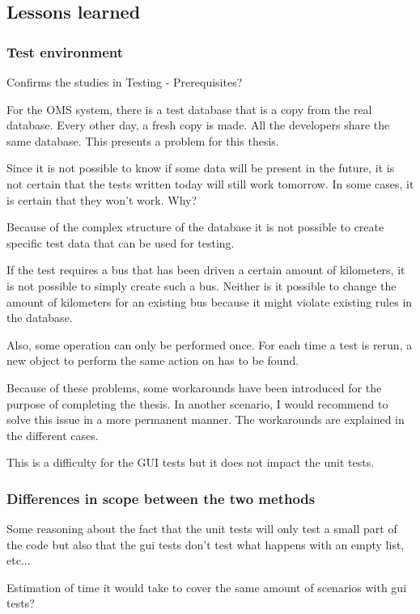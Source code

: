 \documentclass{article}
\begin{document}
		\subsection{Lessons learned}
			\subsubsection{Test environment}

			Confirms the studies in Testing - Prerequisites?

			For the OMS system, there is a test database that is a copy from the real database. Every other day, a fresh copy is made. All the developers share the same database. This presents a problem for this thesis. 

			Since it is not possible to know if some data will be present in the future, it is not certain that the tests written today will still work tomorrow. In some cases, it is certain that they won't work. Why?

			Because of the complex structure of the database it is not possible to create specific test data that can be used for testing.

			If the test requires a bus that has been driven a certain amount of kilometers, it is not possible to simply create such a bus. Neither is it possible to change the amount of kilometers for an existing bus because it might violate existing rules in the database. 

			Also, some operation can only be performed once. For each time a test is rerun, a new object to perform the same action on has to be found.

			Because of these problems, some workarounds have been introduced for the purpose of completing the thesis. In another scenario, I would recommend to solve this issue in a more permanent manner. The workarounds are explained in the different cases.

			This is a difficulty for the GUI tests but it does not impact the unit tests.

			\subsubsection{Differences in scope between the two methods}
			Some reasoning about the fact that the unit tests will only test a small part of the code but also that the gui tests don't test what happens with an empty list, etc...

			Estimation of time it would take to cover the same amount of scenarios with gui tests?
\end{document}

